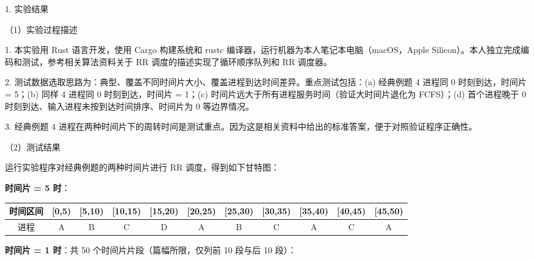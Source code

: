 \noindent\hspace*{2em}1. 实验结果\par
\noindent\hspace*{2em}（1）实验过程描述\par
\noindent\hspace*{2em}1. 本实验用 Rust 语言开发，使用 Cargo 构建系统和 rustc 编译器，运行机器为本人笔记本电脑（macOS，Apple Silicon）。本人独立完成编码和测试，参考相关算法资料关于 RR 调度的描述实现了循环顺序队列和 RR 调度器。\par
\noindent\hspace*{2em}2. 测试数据选取思路为：典型、覆盖不同时间片大小、覆盖进程到达时间差异。重点测试包括：(a) 经典例题 4 进程同 0 时刻到达，时间片 = 5；(b) 同样 4 进程同 0 时刻到达，时间片 = 1；(c) 时间片远大于所有进程服务时间（验证大时间片退化为 FCFS）；(d) 首个进程晚于 0 时刻到达、输入进程未按到达时间排序、时间片为 0 等边界情况。\par
\noindent\hspace*{2em}3. 经典例题 4 进程在两种时间片下的周转时间是测试重点。因为这是相关资料中给出的标准答案，便于对照验证程序正确性。\par
\noindent\hspace*{2em}（2）测试结果\par
\noindent\hspace*{2em}运行实验程序对经典例题的两种时间片进行 RR 调度，得到如下甘特图：\par
\noindent\hspace*{2em}\textbf{时间片 = 5 时}：\par
\begin{center}
\fontsize{8.5pt}{11pt}\selectfont
\renewcommand{\arraystretch}{1.2}
\begin{tabular}{|c|c|c|c|c|c|c|c|c|c|c|}
\hline
时间区间 & [0,5) & [5,10) & [10,15) & [15,20) & [20,25) & [25,30) & [30,35) & [35,40) & [40,45) & [45,50) \\ \hline
进程 & A & B & C & D & A & B & C & A & C & A \\ \hline
\end{tabular}
\end{center}
\noindent\hspace*{2em}\textbf{时间片 = 1 时}：共 50 个时间片片段（篇幅所限，仅列前 10 段与后 10 段）：\par
